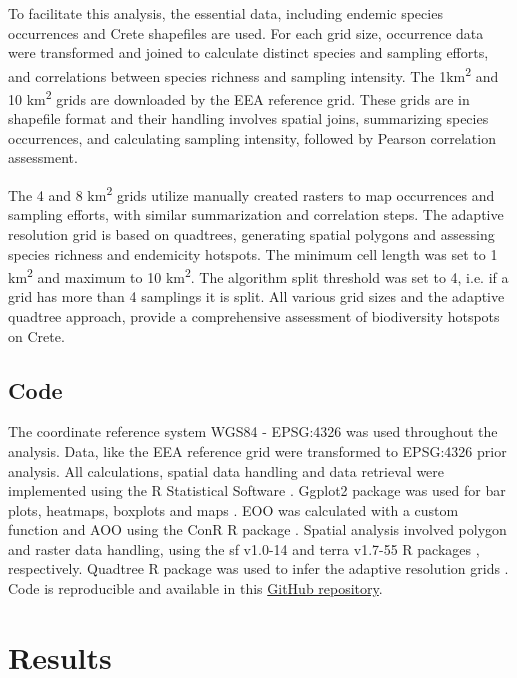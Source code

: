 To facilitate this analysis, the essential data, including endemic species occurrences and Crete shapefiles
are used. For each grid size, occurrence
data were transformed and joined to calculate distinct species and sampling efforts,
and correlations between species richness and sampling intensity.
The 1km\textsuperscript{2} and 10 km\textsuperscript{2} grids are downloaded by the 
EEA reference grid.
These grids are in shapefile format and their handling involves spatial joins,
summarizing species occurrences, and calculating sampling intensity,
followed by Pearson correlation assessment.

The 4 and 8 km\textsuperscript{2} grids utilize manually created rasters to map occurrences and
sampling efforts, with similar summarization and correlation steps.
The adaptive resolution grid is based on quadtrees, generating spatial polygons
and assessing species richness and endemicity hotspots.
The minimum cell length was set to 1 km\textsuperscript{2} and maximum to 10 km\textsuperscript{2}.
The algorithm split threshold was set to 4, i.e. if a grid has more than 4 samplings
it is split.
All various grid sizes and the adaptive quadtree approach, provide a comprehensive assessment of biodiversity hotspots on Crete.


    \subsection{Code}
    \label{subsec:arthropods-tools}

The coordinate reference system WGS84 - EPSG:4326 was used throughout the analysis.
Data, like the EEA reference grid were transformed to EPSG:4326 prior analysis.
All calculations, spatial data handling and data retrieval were implemented using the R Statistical Software \parencite{rcoreteam}.
Ggplot2 package was used for bar plots, heatmaps, boxplots and maps \parencite{wickham_ggplot2_2016}.
EOO was calculated with a custom function and AOO using the ConR R package \parencite{dauby2017conr:}.
Spatial analysis involved polygon and raster data handling, using the sf v1.0-14 \parencite{pebesma2018simple}
and terra v1.7-55 R packages \parencite{hijmans2024terra}, respectively.
Quadtree R package was used to infer the adaptive resolution grids \parencite{friend2023quadtree}.
Code is reproducible and available in this 
\href{https://github.com/savvas-paragkamian/arthropoda_assessment_crete}{GitHub repository}.


\section{Results}
\label{sec:arthropods-results}

